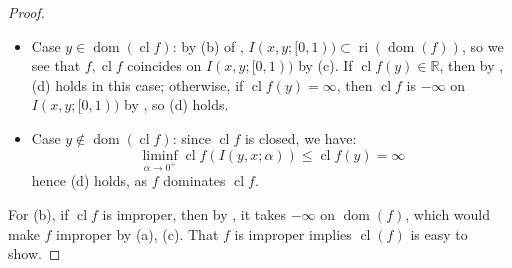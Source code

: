 \begin{proof}
\begin{itemize}
		\item Case $y\in \operatorname{dom}(\operatorname{cl}f)$: by (b) of , $I(x,y;[0, 1))\subset \operatorname{ri}(\operatorname{dom}(f))$, so we see that $f,\operatorname{cl}f$ coincides on $I(x,y;[0,1))$ by (c). If $\operatorname{cl}f(y)\in \mathbb{R}$, then by , (d) holds in this case; otherwise, if $\operatorname{cl}f(y)=\infty$, then $\operatorname{cl}f$ is $-\infty$ on $I(x,y;[0,1))$ by , so (d) holds.
		\item Case $y\notin \operatorname{dom}(\operatorname{cl}f)$: since $\operatorname{cl}f$ is closed, we have:
		      \[
			      \underset{\alpha \to 0^+}{\operatorname{liminf}}\operatorname{cl}f(I(y,x;\alpha ))\leq \operatorname{cl}f(y)=\infty
		      \]
		      hence (d) holds, as $f$ dominates $\operatorname{cl}f$.
	\end{itemize}
	For (b), if $\operatorname{cl}f$ is improper, then by , it takes $-\infty$ on $\operatorname{dom}(f)$, which would make $f$ improper by (a), (c). That $f$ is improper implies $\operatorname{cl}(f)$ is easy to show.
\end{proof}

